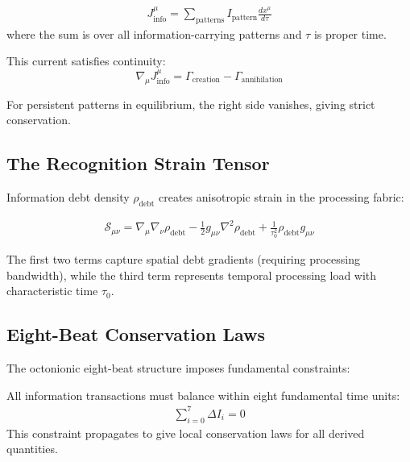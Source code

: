 \documentclass[12pt]{article}
\begin{document}
\begin{definition}
\begin{align}
J^\mu_{\text{info}} = \sum_{\text{patterns}} I_{\text{pattern}} \frac{dx^\mu}{d\tau}
\end{align}
where the sum is over all information-carrying patterns and $\tau$ is proper time.
\end{definition}

This current satisfies continuity:
\begin{equation}
\nabla_\mu J^\mu_{\text{info}} = \Gamma_{\text{creation}} - \Gamma_{\text{annihilation}}
\end{equation}

For persistent patterns in equilibrium, the right side vanishes, giving strict conservation.

\subsection{The Recognition Strain Tensor}

Information debt density $\rho_{\text{debt}}$ creates anisotropic strain in the processing fabric:

\begin{definition}
\begin{align}
\mathcal{S}_{\mu\nu} = \nabla_\mu \nabla_\nu \rho_{\text{debt}} - \frac{1}{2}g_{\mu\nu}\nabla^2 \rho_{\text{debt}} + \frac{1}{\tau_0^2} \rho_{\text{debt}} g_{\mu\nu}
\end{align}
\end{definition}

The first two terms capture spatial debt gradients (requiring processing bandwidth), while the third term represents temporal processing load with characteristic time $\tau_0$.

\subsection{Eight-Beat Conservation Laws}

The octonionic eight-beat structure imposes fundamental constraints:

\begin{theorem}
All information transactions must balance within eight fundamental time units:
\begin{align}
\sum_{i=0}^{7} \Delta I_i = 0
\end{align}
This constraint propagates to give local conservation laws for all derived quantities.
\end{theorem}
\end{document}
